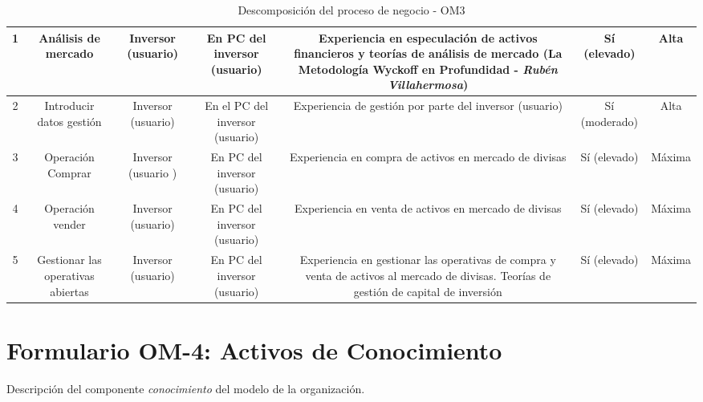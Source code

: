 \begin{table}[H]
{\begin{tabular}{|c|c|c|c|c|c|c|}
      1 & Análisis de mercado & \multicolumn{1}{|p{3.0cm}|}{\centering Inversor (usuario)}& \multicolumn{1}{|p{3.0cm}|}{\centering En PC del inversor (usuario)} & \multicolumn{1}{|p{5.0cm}|}{\centering Experiencia en especulación de activos financieros y teorías de análisis de mercado (La Metodología Wyckoff en Profundidad - \textit{Rubén Villahermosa})} & Sí (elevado) & Alta \\
      \hline
      2 & Introducir datos gestión & \multicolumn{1}{|p{3.0cm}|}{\centering Inversor (usuario)} & \multicolumn{1}{|p{3.0cm}|}{\centering En el PC del inversor (usuario)} & \multicolumn{1}{|p{5.0cm}|}{\centering Experiencia de gestión por parte del inversor (usuario)} & Sí (moderado) & Alta \\
      \hline
      3 & Operación Comprar & \multicolumn{1}{|p{3.0cm}|}{\centering Inversor (usuario )}& \multicolumn{1}{|p{3.0cm}|}{\centering En PC del inversor (usuario)} & \multicolumn{1}{|p{5.0cm}|}{\centering Experiencia en compra de activos en mercado de divisas} & Sí (elevado) & Máxima \\
      \hline
      4 & Operación vender & \multicolumn{1}{|p{3.0cm}|}{\centering Inversor (usuario)}& \multicolumn{1}{|p{3.0cm}|}{\centering En PC del inversor (usuario)} & \multicolumn{1}{|p{5.0cm}|}{\centering Experiencia en venta de activos en mercado de divisas} & Sí (elevado) & Máxima \\
      \hline      
      5 & \multicolumn{1}{|p{3.0cm}|}{\centering Gestionar las operativas abiertas} & \multicolumn{1}{|p{3.0cm}|}{\centering Inversor (usuario)} &  \multicolumn{1}{|p{3.0cm}|}{\centering En PC del inversor (usuario)} & \multicolumn{1}{|p{5.0cm}|}{\centering Experiencia en gestionar las operativas de compra y venta de activos al mercado de divisas. Teorías de gestión de capital de inversión} & Sí (elevado) & Máxima \\
      \hline
    \end{tabular}
  }
	\caption{\label{tab:OM3}Descomposición del proceso de negocio - OM3}
\end{table}

\newpage
\section{Formulario OM-4: Activos de Conocimiento}

Descripción del componente \textit{conocimiento} del modelo de la organización.

